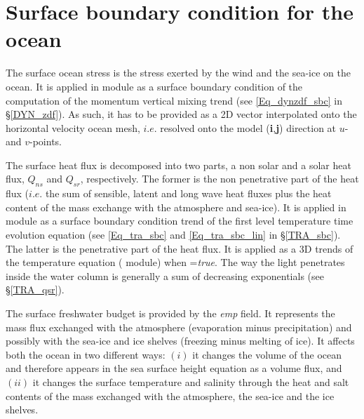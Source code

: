 \documentclass[NEMO_book]{subfiles}
\begin{document}
\section{Surface boundary condition for the ocean}
\label{SBC_general}

The surface ocean stress is the stress exerted by the wind and the sea-ice 
on the ocean. It is applied in  module as a surface boundary condition of the 
computation of the momentum vertical mixing trend (see \eqref{Eq_dynzdf_sbc} in \S\ref{DYN_zdf}).
As such, it has to be provided as a 2D vector interpolated 
onto the horizontal velocity ocean mesh, $i.e.$ resolved onto the model 
(\textbf{i},\textbf{j}) direction at $u$- and $v$-points.

The surface heat flux is decomposed into two parts, a non solar and a solar heat 
flux, $Q_{ns}$ and $Q_{sr}$, respectively. The former is the non penetrative part 
of the heat flux ($i.e.$ the sum of sensible, latent and long wave heat fluxes 
plus the heat content of the mass exchange with the atmosphere and sea-ice). 
It is applied in  module as a surface boundary condition trend of 
the first level temperature time evolution equation (see \eqref{Eq_tra_sbc} 
and \eqref{Eq_tra_sbc_lin} in \S\ref{TRA_sbc}). 
The latter is the penetrative part of the heat flux. It is applied as a 3D 
trends of the temperature equation ( module) when =\textit{true}.
The way the light penetrates inside the water column is generally a sum of decreasing 
exponentials (see \S\ref{TRA_qsr}). 

The surface freshwater budget is provided by the \textit{emp} field.
It represents the mass flux exchanged with the atmosphere (evaporation minus precipitation) 
and possibly with the sea-ice and ice shelves (freezing minus melting of ice). 
It affects both the ocean in two different ways: 
$(i)$   it changes the volume of the ocean and therefore appears in the sea surface height 
equation as a volume flux, and 
$(ii)$  it changes the surface temperature and salinity through the heat and salt contents 
of the mass exchanged with the atmosphere, the sea-ice and the ice shelves. 


%
%
%
%
%
%
% 
%
\end{document}

